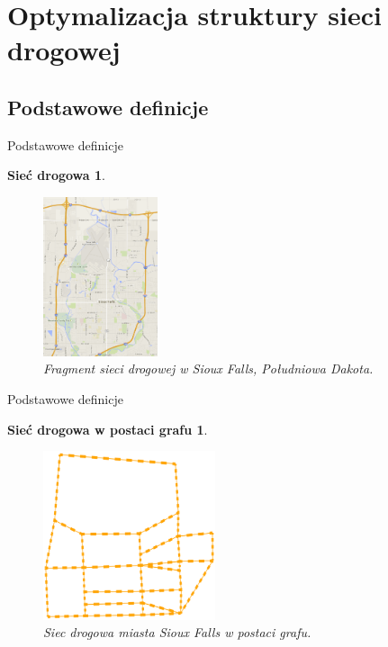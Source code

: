 \documentclass{beamer}
\begin{document}
\section{Optymalizacja struktury sieci drogowej}

\subsection{Podstawowe definicje}
\begin{frame}{Podstawowe definicje} 

\newtheorem{mydef1}{Sieć drogowa}
\begin{mydef1}
	\begin{figure}[h!]
	\includegraphics[width=0.30\textwidth]{img/siec}
	\caption{Fragment sieci drogowej w Sioux Falls, Południowa Dakota.} 
	\end{figure}
\end{mydef1}

\end{frame}

\begin{frame}{Podstawowe definicje} 

\newtheorem{mydef2}{Sieć drogowa w postaci grafu}
\begin{mydef2}
	\begin{figure}[h!]
	\includegraphics[width=0.45\textwidth]{img/graf}
	\caption{Siec drogowa miasta Sioux Falls w postaci grafu.} 
	\end{figure}
\end{mydef2}
\end{frame}
\end{document}
